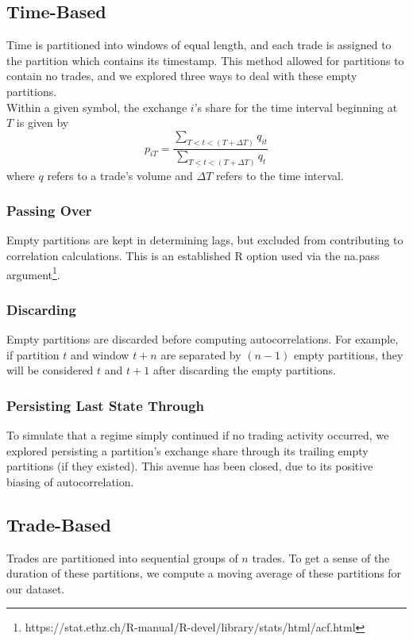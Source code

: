 \documentclass{article}
\begin{document}
\subsection{Time-Based}
Time is partitioned into windows of equal length, and each trade is assigned to the partition which contains its timestamp. This method allowed for partitions to contain no trades, and we explored three ways to deal with these empty partitions.\\

Within a given symbol, the exchange $i$'s share for the time interval beginning at $T$ is given by
$$p_{iT} = \frac{\sum_{T\underline{<}t < (T+\Delta T)} q_{it}}{\sum_{T\underline{<}t < (T+\Delta T)}q_{t}}$$
where $q$ refers to a trade's volume and $\Delta T$ refers to the time interval.\\

\subsubsection{Passing Over} \label{passoverempty}
Empty partitions are kept in determining lags, but excluded from contributing to correlation calculations. This is an established R option used via the na.pass argument\footnote{https://stat.ethz.ch/R-manual/R-devel/library/stats/html/acf.html}.\\

\subsubsection{Discarding} \label{discardempty}
Empty partitions are discarded before computing autocorrelations. For example, if partition $t$ and window $t + n$ are separated by $(n - 1)$ empty partitions, they will be considered $t$ and $t + 1$ after discarding the empty partitions.\\

\subsubsection{Persisting Last State Through} \label{persistempty}
To simulate that a regime simply continued if no trading activity occurred, we explored persisting a partition's exchange share through its trailing empty partitions (if they existed). This avenue has been closed, due to its positive biasing of autocorrelation.\\

\subsection{Trade-Based}
Trades are partitioned into sequential groups of $n$ trades. To get a sense of the duration of these partitions, we compute a moving average of these partitions for our dataset.\\
\end{document}
